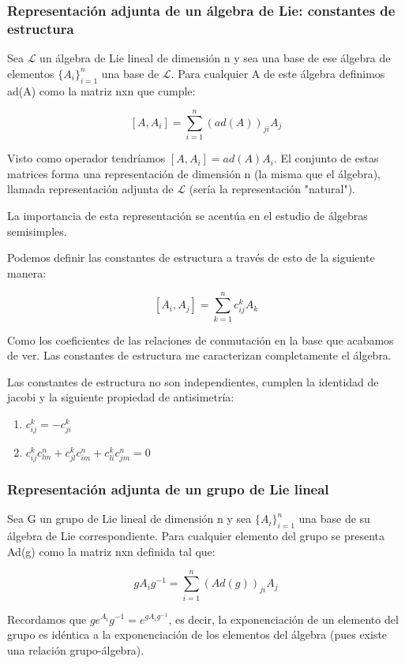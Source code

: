 \documentclass{article}
\begin{document}
\subsubsection{Representación adjunta de un álgebra de Lie: constantes de estructura}

Sea $\mathcal{L}$ un álgebra de Lie lineal de dimensión n y sea una base de ese álgebra de elementos $\lbrace A_i\rbrace _{i=1}^n$ una base de $\mathcal{L}$. Para cualquier A de este álgebra definimos ad(A) como la matriz nxn que cumple:

$$[A,A_i]=\sum _{i=1}^n (ad(A))_{ji}A_j$$

Visto como operador tendríamos $[A,A_i]=ad(A)A_i$. El conjunto de estas matrices forma una representación de dimensión n (la misma que el álgebra), llamada representación adjunta de $\mathcal{L}$ (sería la representación "natural").

La importancia de esta representación se acentúa en el estudio de álgebras semisimples.

\smallskip
Podemos definir las constantes de estructura a través de esto de la siguiente manera:

$$[A_i,A_j]=\sum _{k=1}^n c_{ij}^k A_k$$

Como los coeficientes de las relaciones de conmutación en la base que acabamos de ver. Las constantes de estructura me caracterizan completamente el álgebra.

Las constantes de estructura no son independientes, cumplen la identidad de jacobi y la siguiente propiedad de antisimetría:

\begin{enumerate}
\item $     c_{ij}^k=-c_{ji}^k $
\item $
c_{ij}^kc_{lm}^n + c^k_{jl}c_{im}^n+ c_{li}^kc^n_{jm}=0 $
\end{enumerate}


\subsubsection{Representación adjunta de un grupo de Lie lineal}

Sea G un grupo de Lie lineal de dimensión n y sea $\lbrace A_i \rbrace _{i=1}^n$ una base de su álgebra de Lie correspondiente. Para cualquier elemento del grupo se presenta Ad(g) como la matriz nxn definida tal que:

$$gA_ig^{-1}=\sum _{i=1}^n (Ad(g))_{ji} A_j$$

Recordamos que $ge^{A_i}g^{-1}=e^{gA_ig^{-1}}$, es decir, la exponenciación de un elemento del grupo es idéntica a la exponenciación de los elementos del álgebra (pues existe una relación grupo-álgebra).
\end{document}
